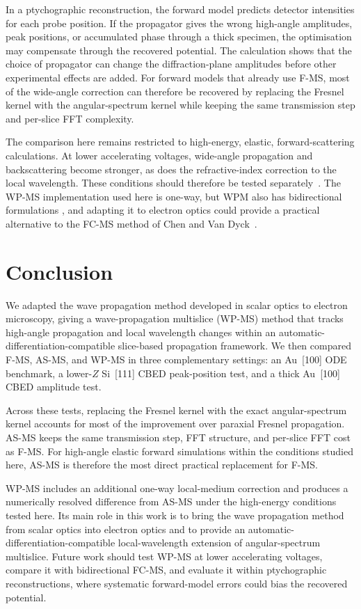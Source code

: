 \documentclass[preprint,12pt,number]{elsarticle}
\begin{document}
In a ptychographic reconstruction, the forward model predicts detector
intensities for each probe position. If the propagator gives the wrong
high-angle amplitudes, peak positions, or accumulated phase through a thick
specimen, the optimisation may compensate through the recovered potential.
The calculation shows that the choice of
propagator can change the diffraction-plane amplitudes before other
experimental effects are added. For forward models that already use F-MS, most
of the wide-angle correction can therefore be recovered by replacing the
Fresnel kernel with the angular-spectrum kernel while keeping the same
transmission step and per-slice FFT complexity.

The comparison here remains restricted to high-energy, elastic,
forward-scattering calculations. At lower accelerating voltages, wide-angle
propagation and backscattering become stronger, as does the refractive-index
correction to the local wavelength. These conditions should therefore be tested
separately~\cite{ming2013pcms,WackerSchroeder2015,hillier_role_2017}. The WP-MS
implementation used here is one-way, but WPM also has bidirectional formulations
\cite{FertigBrenner2010,Fertig2011,WendeDrozellaHerkommer2023}, and adapting
it to electron optics could provide a practical alternative to the FC-MS
method of Chen and Van Dyck~\cite{ChenVanDyck1997}.
 
\section{Conclusion}

We adapted the wave propagation method developed in scalar optics to
electron microscopy, giving a wave-propagation multislice (WP-MS) method that
tracks high-angle propagation and local wavelength changes within an
automatic-differentiation-compatible slice-based propagation framework. We
then compared F-MS,
AS-MS, and WP-MS in
three complementary settings: an Au~[100] ODE benchmark, a lower-$Z$ Si~[111]
CBED peak-position test, and a thick Au~[100] CBED amplitude test.

Across these tests, replacing the Fresnel kernel with the exact
angular-spectrum kernel accounts for most of the improvement over paraxial
Fresnel propagation. AS-MS keeps the same transmission step, FFT structure, and
per-slice FFT cost as F-MS. For high-angle elastic forward simulations within
the conditions studied here, AS-MS is therefore the most direct practical
replacement for F-MS.

WP-MS includes an additional one-way local-medium correction and produces a
numerically resolved difference from AS-MS under the high-energy conditions
tested here. Its main role in this work is to bring the wave propagation method
from scalar optics into electron optics and to provide an
automatic-differentiation-compatible local-wavelength extension of
angular-spectrum multislice. Future work should test WP-MS at
lower accelerating voltages, compare it with bidirectional FC-MS, and evaluate
it within ptychographic reconstructions, where systematic forward-model errors
could bias the recovered potential.
\end{document}

